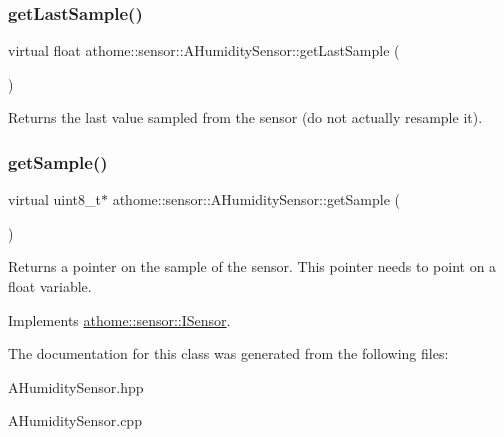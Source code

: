 \mbox{\label{classathome_1_1sensor_1_1_a_humidity_sensor_ae251ee6e1fe5f9c2601f9a4464cfc5d1}} 
\subsubsection{\texorpdfstring{get\+Last\+Sample()}{getLastSample()}}
{\footnotesize\ttfamily virtual float athome\+::sensor\+::\+A\+Humidity\+Sensor\+::get\+Last\+Sample (\begin{DoxyParamCaption}{ }\end{DoxyParamCaption})\hspace{0.3cm}{\ttfamily [pure virtual]}}

Returns the last value sampled from the sensor (do not actually resample it). \mbox{\label{classathome_1_1sensor_1_1_a_humidity_sensor_a2eb6de3ce2a4aeae0d9e556389d2b329}} 
\subsubsection{\texorpdfstring{get\+Sample()}{getSample()}}
{\footnotesize\ttfamily virtual uint8\+\_\+t$\ast$ athome\+::sensor\+::\+A\+Humidity\+Sensor\+::get\+Sample (\begin{DoxyParamCaption}{ }\end{DoxyParamCaption})\hspace{0.3cm}{\ttfamily [pure virtual]}}

Returns a pointer on the sample of the sensor. This pointer needs to point on a float variable. 

Implements \mbox{\hyperlink{classathome_1_1sensor_1_1_i_sensor_a2513fd8acc5d8251439330ca0e78cf04}{athome\+::sensor\+::\+I\+Sensor}}.



The documentation for this class was generated from the following files\+:\begin{DoxyCompactItemize}
\item 
A\+Humidity\+Sensor.\+hpp\item 
A\+Humidity\+Sensor.\+cpp\end{DoxyCompactItemize}
